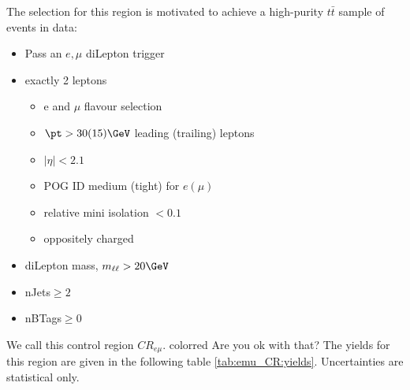 The selection for this region is motivated to achieve a high-purity $t\bar{t}$ sample of events in data:

\begin{itemize}
  \item Pass an $e,\mu$ diLepton trigger
  \item exactly 2 leptons
  \begin{itemize}
    \item e and $\mu$ flavour selection
    \item $\pt>30(15)\GeV$ leading (trailing) leptons 
    \item $|\eta|<2.1$
    \item POG ID medium (tight) for $e (\mu)$
    \item relative mini isolation $<0.1$
    \item oppositely charged
  \end{itemize}
  \item diLepton mass, $m_{\ell\ell}>20\GeV$
  \item nJets$\ge2$
  \item nBTags$\ge0$
\end{itemize}

We call this control region $CR_{e\mu}$. {color{red} Are you ok with that?}
The yields for this region are given in the following table \ref{tab:emu_CR:yields}.  Uncertainties are statistical only.  

